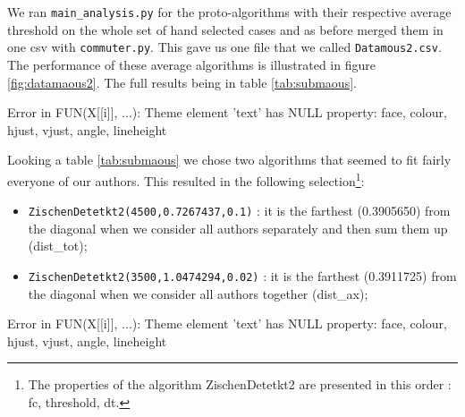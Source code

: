 \documentclass{article}\usepackage[]{graphicx}\usepackage[]{color}
\begin{document}
We ran {\tt main{\_}analysis.py} for the proto-algorithms with their respective average threshold on the whole set of hand selected cases and as before merged them in one csv with {\tt commuter.py}. This gave us one file that we called {\tt Datamous2.csv}. The performance of these average algorithms is illustrated in figure \ref{fig:datamaous2}. The full results being in table \ref{tab:submaous}.

\begin{Schunk}
\begin{Soutput}
Error in FUN(X[[i]], ...): Theme element 'text' has NULL property: face, colour, hjust, vjust, angle, lineheight
\end{Soutput}
\end{Schunk}

Looking a table \ref{tab:submaous} we chose two algorithms that seemed to fit fairly everyone of our authors. This resulted in the following selection\footnote{The properties of the algorithm ZischenDetetkt2 are presented in this order : fc, threshold, dt.}:
\begin{itemize}
\item {\tt ZischenDetetkt2(4500,0.7267437,0.1)} : it is the farthest (0.3905650) from the diagonal when we consider all authors separately and then sum them up (dist{\_}tot);
\item {\tt ZischenDetetkt2(3500,1.0474294,0.02)} : it is the farthest (0.3911725) from the diagonal when we consider all authors together (dist{\_}ax);
\end{itemize}

\begin{Schunk}
\begin{Soutput}
Error in FUN(X[[i]], ...): Theme element 'text' has NULL property: face, colour, hjust, vjust, angle, lineheight
\end{Soutput}
\end{Schunk}
\end{document}
